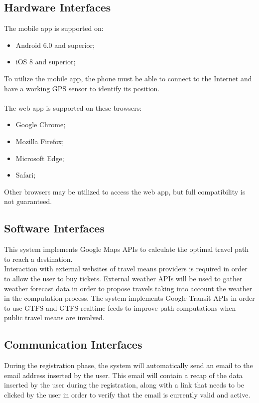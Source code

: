 \subsection{Hardware Interfaces}
\label{subsect:Hardware Interfaces}
	The mobile app is supported on:
	\begin{itemize}
		\item Android 6.0 and superior;
		\item iOS 8 and superior;
	\end{itemize}
	To utilize the mobile app, the phone must be able to connect to the Internet and have a working GPS sensor to identify its position. \\ \\
	The web app is supported on these browsers:
	\begin{itemize}
		\item Google Chrome;
		\item Mozilla Firefox;
		\item Microsoft Edge;
		\item Safari;
	\end{itemize}
	Other browsers may be utilized to access the web app, but full compatibility is not guaranteed.
\subsection{Software Interfaces}
\label{subsect:Software Interfaces}
	This system implements Google Maps APIs to calculate the optimal travel path to reach a destination. \\
	Interaction with external websites of travel means providers is required in order to allow the user to buy tickets.
	External weather APIs will be used to gather weather forecast data in order to propose travels taking into account the weather in the computation process.
	The system implements Google Transit APIs in order to use GTFS and GTFS-realtime feeds to improve path computations when public travel means are involved.
	
	
\subsection{Communication Interfaces}
\label{subsect:Communication Interfaces}
	During the registration phase, the system will automatically send an email to the email address inserted by the user. This email will contain a recap of the data inserted by the user during the registration, along with a link that needs to be clicked by the user in order to verify that the email is currently valid and active.